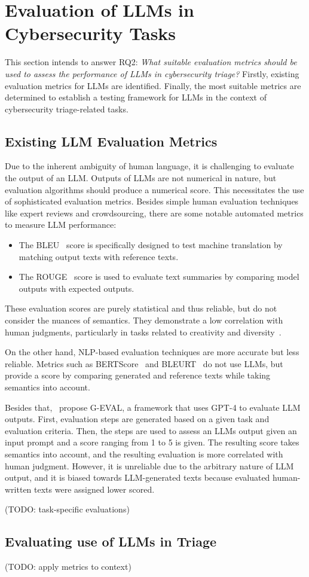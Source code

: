 \section{Evaluation of LLMs in Cybersecurity Tasks}
\label{sec:rq2}

This section intends to answer RQ2:
\textit{What suitable evaluation metrics should be used to assess the performance of LLMs in cybersecurity triage?}
Firstly, existing evaluation metrics for LLMs are identified.
Finally, the most suitable metrics are determined to establish a testing framework for LLMs in the context of
cybersecurity triage-related tasks.

\subsection{Existing LLM Evaluation Metrics}
\label{subsec:rq2-existing-metrics}

Due to the inherent ambiguity of human language, it is challenging to evaluate the output of an LLM\@.
Outputs of LLMs are not numerical in nature, but evaluation algorithms should produce a numerical score.
This necessitates the use of sophisticated evaluation metrics.
Besides simple human evaluation techniques like expert reviews and crowdsourcing, there are some notable automated
metrics to measure LLM performance:
\begin{itemize}
    \item The BLEU\ \citep{papineni2002bleu} score is specifically designed to test machine translation by matching
    output texts with reference texts.
    \item The ROUGE\ \citep{lin2004rouge} score is used to evaluate text summaries by comparing model outputs with
    expected outputs.
\end{itemize}
These evaluation scores are purely statistical and thus reliable, but do not consider the nuances of semantics.
They demonstrate a low correlation with human judgments, particularly in tasks related to creativity and
diversity\ \citep{liu2023gpteval}.

On the other hand, NLP-based evaluation techniques are more accurate but less reliable.
Metrics such as BERTScore\ \citep{zhang2019bertscore} and BLEURT\ \citep{sellam2020bleurt} do not use LLMs, but provide
a score by comparing generated and reference texts while taking semantics into account.

Besides that,\ \citet{liu2023gpteval} propose G-EVAL, a framework that uses GPT-4 to evaluate LLM outputs.
First, evaluation steps are generated based on a given task and evaluation criteria.
Then, the steps are used to assess an LLMs output given an input prompt and a score ranging from 1 to 5 is given.
The resulting score takes semantics into account, and the resulting evaluation is more correlated with human judgment.
However, it is unreliable due to the arbitrary nature of LLM output, and it is biased towards LLM-generated texts
because evaluated human-written texts were assigned lower scored.

(TODO: task-specific evaluations) %

\subsection{Evaluating use of LLMs in Triage}
\label{subsec:rq2-evaluating-triage}

(TODO: apply metrics to context) %